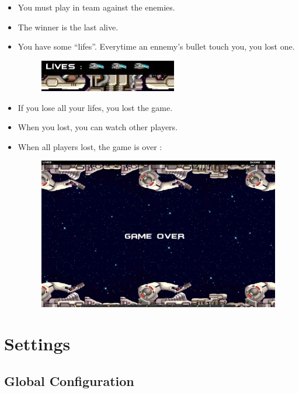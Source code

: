 \documentclass{koala-fr}
\begin{document}
\begin{itemize}
\begin{figure}[H]
\begin{center}
      \end{center}
    \end{figure}    
  \item You must play in team against the enemies.
  \item The winner is the last alive.
  \item You have some ``lifes''. Everytime an ennemy's bullet touch you, you lost one.
    \begin{figure}[H]
      \begin{center}
        \includegraphics[width=6cm]{lifes.jpg}
      \end{center}
    \end{figure}
  \item If you lose all your lifes, you lost the game.
  \item When you lost, you can watch other players.
  \item When all players lost, the game is over :
    \begin{figure}[H]
      \begin{center}
        \includegraphics[width=15cm]{gameover.jpg}
      \end{center}
    \end{figure}
\end{itemize}

\chapter{Settings}

\section{Global Configuration}
\end{document}
